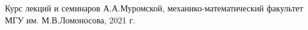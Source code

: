 \begin{thebibliography}{}
		Курс лекций и семинаров А.А.Муромской, механико-математический факультет МГУ им. М.В.Ломоносова, 2021 г.
		
		
		
		
\end{thebibliography}


